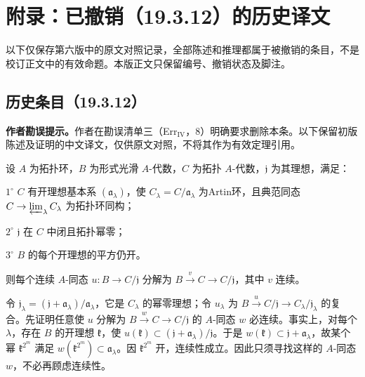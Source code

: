 \section*{附录：已撤销（19.3.12）的历史译文}
以下仅保存第六版中的原文对照记录，全部陈述和推理都属于被撤销的条目，不是校订正文中的有效命题。本版正文只保留编号、撤销状态及脚注。
\subsection*{历史条目（19.3.12）}
\noindent\textbf{作者勘误提示。}作者在勘误清单三（Err$_{\mathrm{IV}}$，8）明确要求删除本条。以下保留初版陈述及证明的中文译文，仅供原文对照，不将其作为有效定理引用。

设 $A$ 为拓扑环，$B$ 为形式光滑 $A$-代数，$C$ 为拓扑 $A$-代数，$\mathfrak j$ 为其理想，满足：

$1^\circ$ $C$ 有开理想基本系 $(\mathfrak a_\lambda)$，使 $C_\lambda=C/\mathfrak a_\lambda$ 为Artin环，且典范同态 $C\to\varprojlim_\lambda C_\lambda$ 为拓扑环同构；

$2^\circ$ $\mathfrak j$ 在 $C$ 中闭且拓扑幂零；

$3^\circ$ $B$ 的每个开理想的平方仍开。

则每个连续 $A$-同态 $u:B\to C/\mathfrak j$ 分解为 $B\xrightarrow{v}C\to C/\mathfrak j$，其中 $v$ 连续。

令 $\mathfrak j_\lambda=(\mathfrak j+\mathfrak a_\lambda)/\mathfrak a_\lambda$，它是 $C_\lambda$ 的幂零理想；令 $u_\lambda$ 为 $B\xrightarrow{u}C/\mathfrak j\to C_\lambda/\mathfrak j_\lambda$ 的复合。先证明任意使 $u$ 分解为 $B\xrightarrow{w}C\to C/\mathfrak j$ 的 $A$-同态 $w$ 必连续。事实上，对每个 $\lambda$，存在 $B$ 的开理想 $\mathfrak k$，使 $u(\mathfrak k)\subset(\mathfrak j+\mathfrak a_\lambda)/\mathfrak j$。于是 $w(\mathfrak k)\subset\mathfrak j+\mathfrak a_\lambda$，故某个幂 $\mathfrak k^{2^m}$ 满足 $w(\mathfrak k^{2^m})\subset\mathfrak a_\lambda$。因 $\mathfrak k^{2^m}$ 开，连续性成立。因此只须寻找这样的 $A$-同态 $w$，不必再顾虑连续性。

